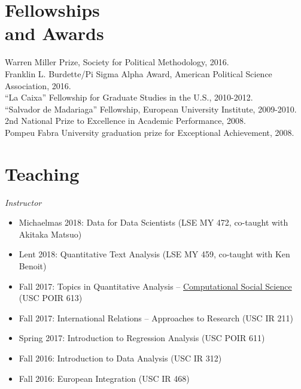 \documentclass[margin,line,11pt]{resume}
\newcommand{\nl}{\vspace{0.10in}\\}
\begin{document}
\begin{resume}

\newpage     

    \section{\mysidestyle Fellowships\\ and Awards}
	Warren Miller Prize, Society for Political Methodology, 2016.\nl
    Franklin L. Burdette/Pi Sigma Alpha Award, American Political Science Association, 2016.\nl
	``La Caixa'' Fellowship for Graduate Studies in the U.S., 2010-2012. \nl
	``Salvador de Madariaga'' Fellowship, European University Institute, 2009-2010. \nl
	 2nd National Prize to Excellence in Academic Performance, 2008. \nl
	Pompeu Fabra University graduation prize for Exceptional Achievement, 2008.


            \section{\mysidestyle Teaching}

\emph{Instructor}
\begin{itemize}
\item Michaelmas 2018: Data for Data Scientists (LSE MY 472, co-taught with Akitaka Matsuo)
\item Lent 2018: Quantitative Text Analysis (LSE MY 459, co-taught with Ken Benoit)
\item Fall 2017: Topics in Quantitative Analysis -- \href{http://pablobarbera.com/POIR613/}{Computational Social Science} (USC POIR 613)
\item Fall 2017: International Relations -- Approaches to Research (USC IR 211)
\item Spring 2017: Introduction to Regression Analysis (USC POIR 611)
\item Fall 2016: Introduction to Data Analysis (USC IR 312)
\item Fall 2016: European Integration (USC IR 468)
\end{itemize}



\end{resume}
\end{document}
